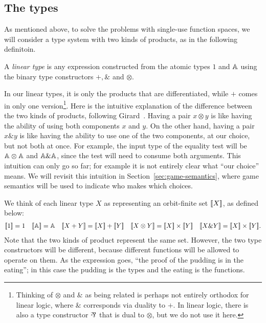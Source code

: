\subsection{The types}
As mentioned above, to solve the problems with single-use function spaces, we will consider a type system with two kinds of products, as in the following definitoin.
\begin{definition}\label{def:datatypes}
    A \emph{linear type} is any expression constructed from the atomic types $1$ and $\mathbb A$ using the binary type constructors $+, \&$ and $\otimes$. 
\end{definition}
In our linear types, it is only the products that are differentiated, while  $+$ comes in only one version\footnote{Thinking of $\otimes$ and $\&$ as being related is perhaps not entirely orthodox for linear logic, where $\&$ corresponds via duality to $+$. In linear logic, there is also a type constructor $\rotatebox[origin=c]{180}{\&}$ that is dual to $\otimes$, but we do not use it here.}.
    Here is the intuitive explanation of the difference between the two kinds of products, following Girard~\cite[p.2]{girard1995advances}. Having a pair $x \otimes y$ is like having the ability of using both components $x$ and $y$. On the other hand, having a pair $x \& y$ is like having the ability to use one of the two components, at our choice, but not both at once. For example, the input type of the equality test will be $\mathbb A \otimes \mathbb A$ and $\mathbb A \& \mathbb A$, since the test will need to consume both arguments. This intuition can only go so far; for example it is not entirely clear what ``our choice'' means. We will revisit this intuition in Section~\ref{sec:game-semantics}, where game semantics will be used to indicate who makes which choices. 



We think of each linear type $X$ as representing an orbit-finite set $[{\kern-0.4ex}[X]{\kern-0.4ex}]$, as defined below:
\begin{align*}
    \sem{1} = 1
\quad 
\sem{\atoms} = \atoms 
\quad 
\sem{X+Y} = \sem X + \sem Y 
\quad 
\sem{X \otimes Y} = \sem X \times \sem Y 
\quad
\sem{X \& Y} = \sem X \times \sem Y.
\end{align*}
Note that the two kinds of product represent the same set.
However, the two type constructors will be  different, because different functions will be allowed to operate on them. As the expression goes, ``the proof of the pudding is in the eating''; in this case the pudding is the types and the eating is the functions.  



